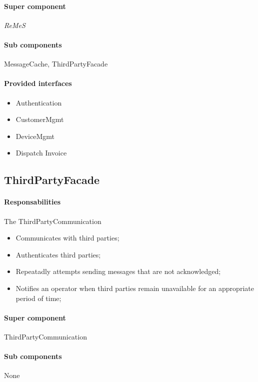 \documentclass[a4paper,10pt]{article}
\newcommand{\rem}{\emph{ReMeS}\xspace}
\begin{document}
\paragraph{Super component} \rem

\paragraph{Sub components} MessageCache, ThirdPartyFacade

\paragraph{Provided interfaces}
\begin{itemize}
    \item Authentication   
    \item CustomerMgmt
    \item DeviceMgmt
    \item Dispatch Invoice
\end{itemize}

\subsection{ThirdPartyFacade}
\paragraph{Responsabilities} 
The ThirdPartyCommunication
\begin{itemize}
	\item Communicates with third parties;
    \item Authenticates third parties;
    \item Repeatadly attempts sending messages that are not acknowledged;
    \item Notifies an operator when third parties remain unavailable for an appropriate period of time;
\end{itemize}

\paragraph{Super component} ThirdPartyCommunication

\paragraph{Sub components} None
\end{document}
